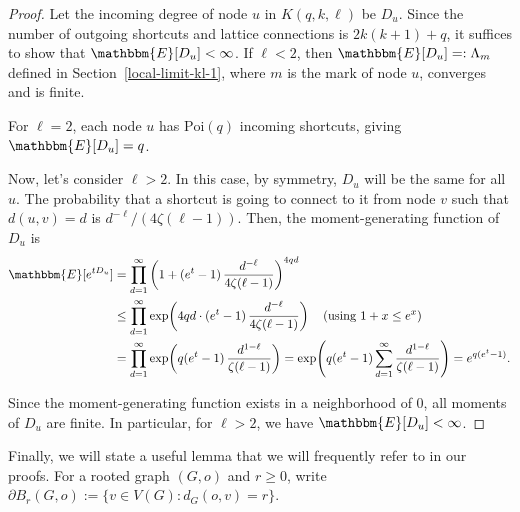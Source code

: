 \documentclass[10pt]{amsart}
\begin{document}
\begin{proof}
    Let the incoming degree of node $u$ in $K(q, k, \ell)$ be $D_{u}$. Since the number of outgoing shortcuts and lattice connections is $2k(k+1) + q$, it suffices to show that $\mathbbm{E}[D_u] < \infty$. 
    If $\ell < 2$, then $\mathbbm{E}[D_u] =: \Lambda_m$ defined in Section~\ref{local-limit-kl-1}, where $m$ is the mark of node $u$, converges and is finite.

    For $\ell = 2$, each node $u$ has $\mathrm{Poi}(q)$ incoming shortcuts, giving $\mathbbm{E}[D_u] = q$.

    Now, let's consider $\ell > 2$. In this case, by symmetry, $D_{u}$ will be the same for all $u$. The probability that a shortcut is going to connect to it from node $v$ such that $d(u, v) = d$ is $d^{-\ell}/(4\zeta(\ell-1))$.
    Then, the moment-generating function of $D_u$ is
\begin{align*}
        \mathbbm{E}[e^{tD_u}]
    &= \prod_{d=1}^\infty \left(1+(e^t-1)\,\frac{d^{-\ell}}{4\zeta(\ell-1)}\right)^{4qd} \\
    &\leq \prod_{d=1}^\infty \exp\!\left(4qd\cdot(e^t-1)\,\frac{d^{-\ell}}{4\zeta(\ell-1)}\right)
       \quad\text{(using }1+x\le e^x\text{)}\\
    &= \prod_{d=1}^\infty \exp\!\left(q(e^t-1)\,\frac{d^{1-\ell}}{\zeta(\ell-1)}\right)
     = \exp\!\left(q(e^t-1)\sum_{d=1}^\infty\frac{d^{1-\ell}}{\zeta(\ell-1)}\right)
     = e^{q(e^t-1)}.
\end{align*}

Since the moment-generating function exists in a neighborhood of $0$, all moments of $D_u$ are finite. In particular, for $\ell > 2$, we have $\mathbbm{E}[D_u] < \infty$.
\end{proof}

Finally, we will state a useful lemma that we will frequently refer to in our proofs. For a rooted graph $(G,o)$ and $r\ge 0$, write
\(
\partial B_r(G,o):=\{v\in V(G): d_G(o,v)=r\}.
\)
\end{document}
